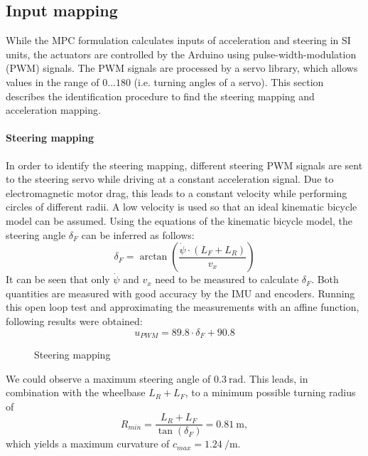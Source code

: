 \subsection{Input mapping}\label{sec:inputMapping}
While the MPC formulation calculates inputs of acceleration and steering in SI units, the actuators are controlled by the Arduino using pulse-width-modulation (PWM) signals. The PWM signals are processed by a servo library, which allows values in the range of $0...180$ (i.e. turning angles of a servo). This section describes the identification procedure to find the steering mapping and acceleration mapping.
\paragraph{Steering mapping}%
In order to identify the steering mapping, different steering PWM signals are sent to the steering servo while driving at a constant acceleration signal. Due to electromagnetic motor drag, this leads to a constant velocity while performing circles of different radii. A low velocity is used so that an ideal kinematic bicycle model can be assumed. Using the equations of the kinematic bicycle model, the steering angle $\delta_F$ can be inferred as follows:
\begin{equation}\label{eq:deltaF}
\delta_F = \arctan\left(\frac{\dot\psi\cdot(L_F+L_R)}{v_x}\right)
\end{equation}
It can be seen that only $\dot \psi$ and $v_x$ need to be measured to calculate $\delta_F$. Both quantities are measured with good accuracy by the IMU and encoders.
Running this open loop test and approximating the measurements with an affine function, following results were obtained:
\begin{equation}
u_{PWM} = 89.8\cdot \delta_F + 90.8
\end{equation}
\begin{figure}[ht]
    \centering
  
    \caption{Steering mapping}
    \label{fig:d_f_mapping}
\end{figure}
We could observe a maximum steering angle of $\SI{0.3}{\radian}$. This leads, in combination with the wheelbase $L_R+L_F$, to a minimum possible turning radius of
\begin{equation}
R_{min} = \frac{L_R+L_F}{\tan(\delta_F)} = \SI{0.81}{\meter},
\end{equation}
which yields a maximum curvature of $c_{max}=\SI{1.24}{\per\meter}$.\\
